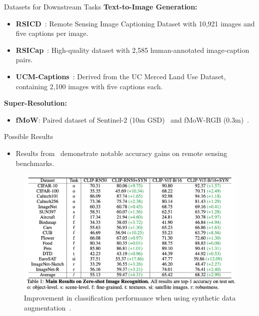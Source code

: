 \begin{refsection}
  \begin{frame}{Datasets for Downstream Tasks}
    \textbf{Text-to-Image Generation:}
    \begin{itemize}
      \item \textbf{RSICD}~\parencite{lu2017exploring}: Remote Sensing Image Captioning Dataset with 10,921 images and five captions per image.
      \item \textbf{RSICap}~\parencite{hu2023rsgpt}: High-quality dataset with 2,585 human-annotated image-caption pairs.
      \item \textbf{UCM-Captions}~\parencite{qu2016deep}: Derived from the UC Merced Land Use Dataset, containing 2,100 images with five captions each.
    \end{itemize}
    \vspace{1em}
    \textbf{Super-Resolution:}
    \begin{itemize}
      \item \textbf{fMoW}: Paired dataset of Sentinel-2 (10m GSD)~\parencite{congFunctionalMapWorld2022} and fMoW-RGB (0.3m)~\parencite{christieFunctionalMapWorld2018}.
    \end{itemize}
    \bottomleftrefs
  \end{frame}
  \end{refsection}

  
\begin{refsection}
  \begin{frame}{Possible Results}
    \begin{itemize}
      \item Results from~\parencite{heSYNTHETICDATAGENERATIVE2022} demonstrate notable accuracy gains on remote sensing benchmarks.
    \end{itemize}
    \begin{figure}
      \centering
      \includegraphics[width=0.70\linewidth]{figs/syn_aug_results.png}
      \caption{\scriptsize Improvement in classification performance when using synthetic data augmentation~\parencite{heSYNTHETICDATAGENERATIVE2022}.}
    \end{figure}
    \bottomleftrefs
  \end{frame}
  \end{refsection}

